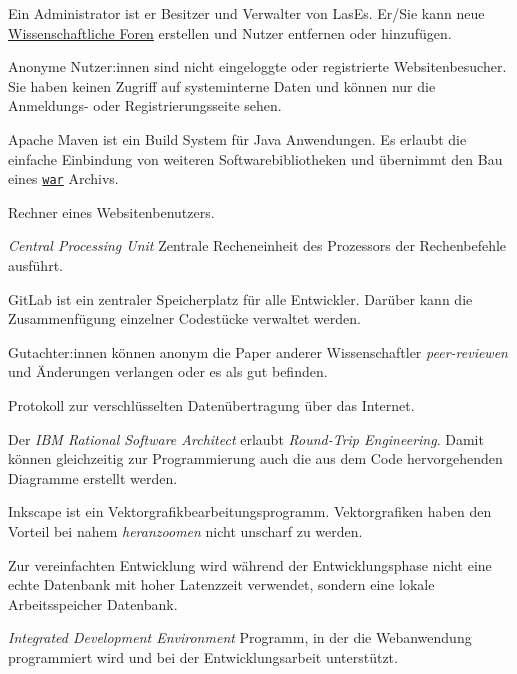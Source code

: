 
\begin{description}
	 Ein Administrator ist er Besitzer und Verwalter von LasEs. Er/Sie kann neue \hyperref[glo:wissForum]{Wissenschaftliche Foren} erstellen und Nutzer entfernen oder hinzufügen.

	 Anonyme Nutzer:innen sind nicht eingeloggte oder registrierte Websitenbesucher. Sie haben keinen Zugriff auf systeminterne Daten und können nur die Anmeldungs- oder Registrierungsseite sehen.

	 Apache Maven ist ein Build System für Java Anwendungen. Es erlaubt die einfache Einbindung von weiteren Softwarebibliotheken und übernimmt den Bau eines \hyperref[glo:war]{\texttt{war}} Archivs.

	 Rechner eines Websitenbenutzers.

	 \emph{Central Processing Unit} Zentrale Recheneinheit des Prozessors der Rechenbefehle ausführt.

	 GitLab ist ein zentraler Speicherplatz für alle Entwickler. Darüber kann die Zusammenfügung einzelner Codestücke verwaltet werden.

	 Gutachter:innen können anonym die Paper anderer Wissenschaftler \emph{peer-reviewen} und Änderungen verlangen oder es als gut befinden.

	 Protokoll zur verschlüsselten Datenübertragung über das Internet.

	 Der \emph{IBM Rational Software Architect} erlaubt \emph{Round-Trip Engineering}. Damit können gleichzeitig zur Programmierung auch die aus dem Code hervorgehenden Diagramme erstellt werden.

	 Inkscape ist ein Vektorgrafikbearbeitungsprogramm. Vektorgrafiken haben den Vorteil bei nahem \emph{heranzoomen} nicht unscharf zu werden.

	 Zur vereinfachten Entwicklung wird während der Entwicklungsphase nicht eine echte Datenbank mit hoher Latenzzeit verwendet, sondern eine lokale Arbeitsspeicher Datenbank.

	 \emph{Integrated Development Environment} Programm, in der die Webanwendung programmiert wird und bei der Entwicklungsarbeit unterstützt.


\end{description}

